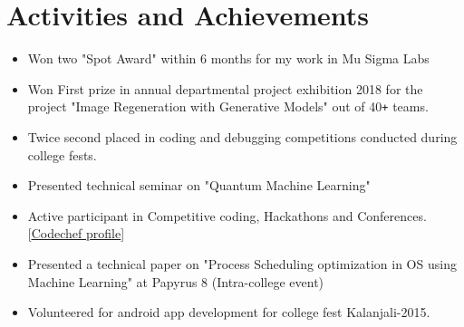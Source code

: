 \documentclass[10pt]{article}
\begin{document}
\section*{Activities and Achievements}
\begin{itemize}
 \itemsep0em
 \item Won two "Spot Award" within 6 months for my work in Mu Sigma Labs
 \item 
 Won First prize in annual departmental project exhibition 2018 for the project "Image Regeneration with Generative Models" out of 40\texttt{+} teams.
 \item 
 Twice second placed in coding and debugging competitions conducted during college fests.
 \item
 Presented technical seminar on "Quantum Machine Learning" 
 \item
 Active participant in Competitive coding, Hackathons and Conferences. \hfill\textcolor{grey_darker}{[\underline{\href{https://www.codechef.com/users/raghavadhanya}{Codechef profile}}]}
 \item
 Presented a technical paper on "Process Scheduling optimization in OS using Machine Learning" at Papyrus
 8 (Intra-college event)
 \item
 Volunteered for android app development for college fest Kalanjali-2015.
\end{itemize}
\end{document}
